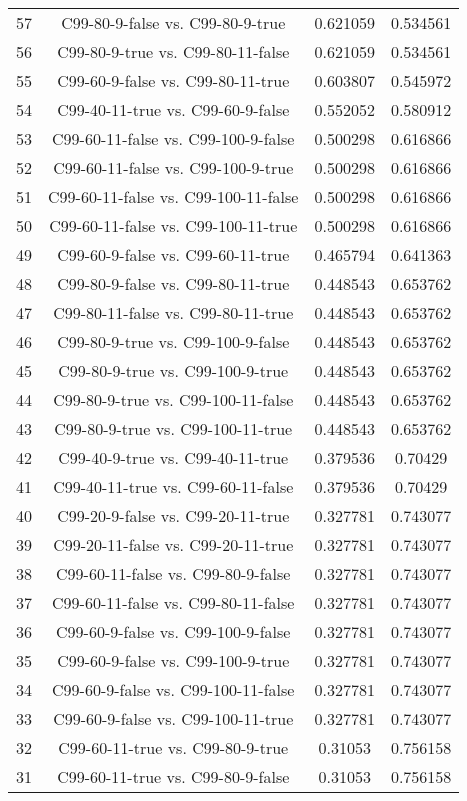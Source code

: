 \documentclass[a4paper,10pt]{article}
\begin{document}
\begin{landscape}
\begin{table}[!htp]
\begin{tabular}{cccc}
57&C99-80-9-false vs. C99-80-9-true&0.621059&0.534561\\
56&C99-80-9-true vs. C99-80-11-false&0.621059&0.534561\\
55&C99-60-9-false vs. C99-80-11-true&0.603807&0.545972\\
54&C99-40-11-true vs. C99-60-9-false&0.552052&0.580912\\
53&C99-60-11-false vs. C99-100-9-false&0.500298&0.616866\\
52&C99-60-11-false vs. C99-100-9-true&0.500298&0.616866\\
51&C99-60-11-false vs. C99-100-11-false&0.500298&0.616866\\
50&C99-60-11-false vs. C99-100-11-true&0.500298&0.616866\\
49&C99-60-9-false vs. C99-60-11-true&0.465794&0.641363\\
48&C99-80-9-false vs. C99-80-11-true&0.448543&0.653762\\
47&C99-80-11-false vs. C99-80-11-true&0.448543&0.653762\\
46&C99-80-9-true vs. C99-100-9-false&0.448543&0.653762\\
45&C99-80-9-true vs. C99-100-9-true&0.448543&0.653762\\
44&C99-80-9-true vs. C99-100-11-false&0.448543&0.653762\\
43&C99-80-9-true vs. C99-100-11-true&0.448543&0.653762\\
42&C99-40-9-true vs. C99-40-11-true&0.379536&0.70429\\
41&C99-40-11-true vs. C99-60-11-false&0.379536&0.70429\\
40&C99-20-9-false vs. C99-20-11-true&0.327781&0.743077\\
39&C99-20-11-false vs. C99-20-11-true&0.327781&0.743077\\
38&C99-60-11-false vs. C99-80-9-false&0.327781&0.743077\\
37&C99-60-11-false vs. C99-80-11-false&0.327781&0.743077\\
36&C99-60-9-false vs. C99-100-9-false&0.327781&0.743077\\
35&C99-60-9-false vs. C99-100-9-true&0.327781&0.743077\\
34&C99-60-9-false vs. C99-100-11-false&0.327781&0.743077\\
33&C99-60-9-false vs. C99-100-11-true&0.327781&0.743077\\
32&C99-60-11-true vs. C99-80-9-true&0.31053&0.756158\\
31&C99-60-11-true vs. C99-80-9-false&0.31053&0.756158\\

\end{tabular}
\end{table}
\end{landscape}
\end{document}
